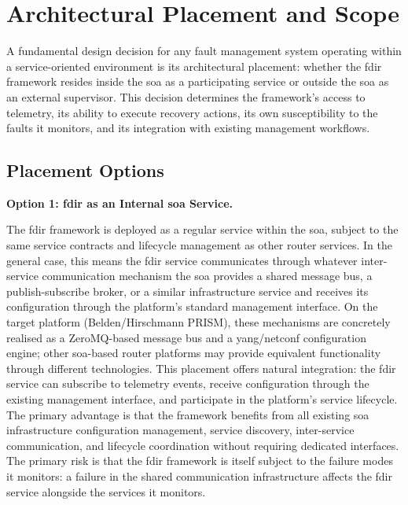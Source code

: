 \section{Architectural Placement and Scope}\label{sec:placement-scope}

A fundamental design decision for any fault management system operating within a service-oriented environment is its architectural placement: whether the \gls{fdir} framework resides inside the \gls{soa} as a participating service or outside the \gls{soa} as an external supervisor. This decision determines the framework's access to telemetry, its ability to execute recovery actions, its own susceptibility to the faults it monitors, and its integration with existing management workflows.

\subsection{Placement Options}\label{sec:placement-options}

\textbf{Option 1: \gls{fdir} as an Internal \gls{soa} Service.}

The \gls{fdir} framework is deployed as a regular service within the \gls{soa}, subject to the same service contracts and lifecycle management as other router services. In the general case, this means the \gls{fdir} service communicates through whatever inter-service communication mechanism the \gls{soa} provides a shared message bus, a publish-subscribe broker, or a similar infrastructure service and receives its configuration through the platform's standard management interface. On the target platform (Belden/Hirschmann PRISM), these mechanisms are concretely realised as a ZeroMQ-based message bus and a \gls{yang}/\gls{netconf} configuration engine; other \gls{soa}-based router platforms may provide equivalent functionality through different technologies. This placement offers natural integration: the \gls{fdir} service can subscribe to telemetry events, receive configuration through the existing management interface, and participate in the platform's service lifecycle. The primary advantage is that the framework benefits from all existing \gls{soa} infrastructure configuration management, service discovery, inter-service communication, and lifecycle coordination without requiring dedicated interfaces. The primary risk is that the \gls{fdir} framework is itself subject to the failure modes it monitors: a failure in the shared communication infrastructure affects the \gls{fdir} service alongside the services it monitors.


